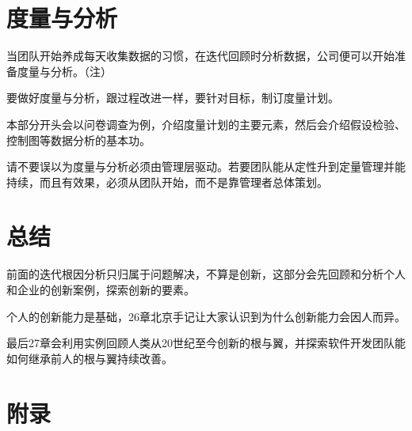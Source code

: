 \documentclass{book}        %
\begin{document}



%



%





%



%



\part{度量与分析}当团队开始养成每天收集数据的习惯，在迭代回顾时分析数据，公司便可以开始准备度量与分析。（注）

要做好度量与分析，跟过程改进一样，要针对目标，制订度量计划。

本部分开头会以问卷调查为例，介绍度量计划的主要元素，然后会介绍假设检验、控制图等数据分析的基本功。

请不要误以为度量与分析必须由管理层驱动。若要团队能从定性升到定量管理并能持续，而且有效果，必须从团队开始，而不是靠管理者总体策划。
%








%




%





\part{总结} 前面的迭代根因分析只归属于问题解决，不算是创新，这部分会先回顾和分析个人和企业的创新案例，探索创新的要素。

个人的创新能力是基础，26章北京手记让大家认识到为什么创新能力会因人而异。

最后27章会利用实例回顾人类从20世纪至今创新的根与翼，并探索软件开发团队能如何继承前人的根与翼持续改善。 




%







\part{附录}





%

%


\end{document}
